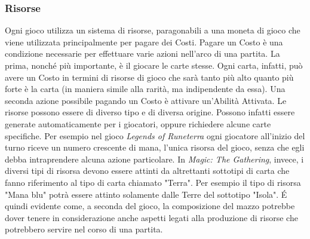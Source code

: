 \documentclass[12pt]{article}
\begin{document}
\subsubsection{Risorse}
Ogni gioco utilizza un sistema di risorse, paragonabili a una moneta di gioco che viene utilizzata principalmente per pagare dei Costi. Pagare un Costo è una condizione necessarie per effettuare varie azioni nell’arco di una partita. La prima, nonché più importante, è il giocare le carte stesse. Ogni carta, infatti, può avere un Costo in termini di risorse di gioco che sarà tanto più alto quanto più forte è la carta (in maniera simile alla rarità, ma indipendente da essa). Una seconda azione possibile pagando un Costo è attivare un'Abilità Attivata.\newline
Le risorse possono essere di diverso tipo e di diversa origine. Possono infatti essere generate automaticamente per i giocatori, oppure richiedere alcune carte specifiche. Per esempio nel gioco \textit{Legends of Runeterra} ogni giocatore all’inizio del turno riceve un numero crescente di mana, l’unica risorsa del gioco, senza che egli debba intraprendere alcuna azione particolare. In \textit{Magic: The Gathering}, invece, i diversi tipi di risorsa devono essere attinti da altrettanti sottotipi di carta che fanno riferimento al tipo di carta chiamato "Terra". Per esempio il tipo di risorsa "Mana blu" potrà essere attinto solamente dalle Terre del sottotipo "Isola". \'E quindi evidente come, a seconda del gioco, la composizione del mazzo potrebbe dover tenere in considerazione anche aspetti legati alla produzione di risorse che potrebbero servire nel corso di una partita.
\end{document}
